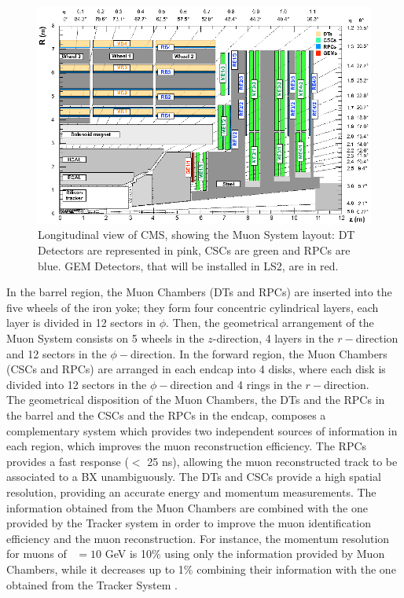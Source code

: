 \begin{center}
\begin{figure}[h]
\centering
\includegraphics[scale=0.4]{figuras/Chapter2/MuonSystem}
\caption{Longitudinal view of CMS, showing the Muon System layout: DT Detectors are represented in pink,
CSCs are green and RPCs are blue. GEM Detectors, that will be installed in LS2, are in red.}\label{figchp2:MuonSystem}
\end{figure}
\end{center}

\noindent In the barrel region, the Muon Chambers (DTs and RPCs) are inserted into the 
five wheels of the iron yoke; they form four concentric cylindrical 
layers, each layer is divided in 12 sectors in $\phi$. Then, the geometrical 
arrangement of the Muon System consists on 5 wheels in the $z$-direction, 4 layers in 
the $r-$direction and 12 sectors in the $\phi-$direction. In the forward region, the Muon Chambers (CSCs and RPCs)
are arranged in each endcap into 4 disks, where each disk is divided into 
12 sectors in the $\phi-$direction and 4 rings in the $r-$direction. \\

\noindent The geometrical disposition of the Muon Chambers, the DTs and the RPCs in the barrel
and the CSCs and the RPCs in the endcap, composes a complementary system which provides
two independent sources of information in each region, which improves the
muon reconstruction efficiency. The RPCs provides a fast response ($<$ 25 ns), allowing 
the muon reconstructed track to be associated to a BX unambiguously. The DTs and CSCs provide 
a high spatial resolution, providing an accurate energy 
and momentum measurements. The information obtained from the Muon Chambers
are combined with the one provided by the Tracker system in order to 
improve the muon identification efficiency and the muon reconstruction. For instance,
the momentum resolution for muons of \pt~$= 10$ GeV is 10$\%$ using only the information
provided by Muon Chambers, while it decreases up to 1$\%$ combining their information with 
the one obtained from the Tracker System \cite{chp2:CMSTDR}.\\

